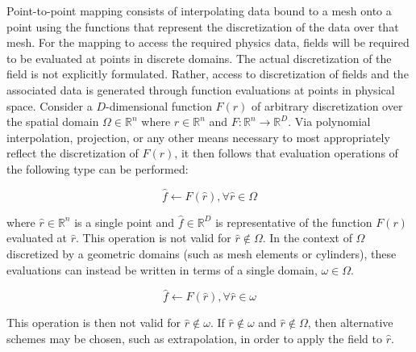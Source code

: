 \documentclass{mc2013}
\begin{document}
\label{subsec:point_to_point}

Point-to-point mapping consists of interpolating data bound to a mesh
onto a point using the functions that represent the discretization of
the data over that mesh. For the mapping to access the required
physics data, fields will be required to be evaluated at points in
discrete domains. The actual discretization of the field is not
explicitly formulated. Rather, access to discretization of fields and
the associated data is generated through function evaluations at
points in physical space. Consider a $D$-dimensional function $F(r)$
of arbitrary discretization over the spatial domain $\Omega \in
\mathbb{R}^n$ where $r \in \mathbb{R}^n$ and $F : \mathbb{R}^n
\rightarrow \mathbb{R}^D$. Via polynomial interpolation, projection,
or any other means necessary to most appropriately reflect the
discretization of $F(r)$, it then follows that evaluation operations
of the following type can be performed:

\begin{equation}
  \hat{f} \leftarrow F(\hat{r}), \forall \hat{r} \in \Omega
  \label{eq:evaluation}
\end{equation}

where $\hat{r} \in \mathbb{R}^n$ is a single point and $\hat{f} \in
\mathbb{R}^D$ is representative of the function $F(r)$ evaluated at
$\hat{r}$. This operation is not valid for $\hat{r} \notin \Omega$. In
the context of $\Omega$ discretized by a geometric domains (such as
mesh elements or cylinders), these evaluations can instead be written
in terms of a single domain, $\omega \in \Omega$.

\begin{equation}
  \hat{f} \leftarrow F(\hat{r}), \forall \hat{r} \in \omega
  \label{eq:element_evaluation}
\end{equation}

This operation is then not valid for $\hat{r} \notin \omega$. If
$\hat{r} \notin \omega$ and $\hat{r} \notin \Omega$, then alternative
schemes may be chosen, such as extrapolation, in order to apply the
field to $\hat{r}$.


\label{subsec:volume_to_volume}

\label{subsec:integral_to_volume}


\label{sec:examples}
\end{document}
